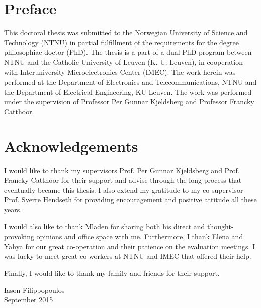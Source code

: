 \vspace*{\fill}
\section*{\Huge Preface }
\bigskip
\bigskip
This doctoral thesis was submitted to the Norwegian University of Science and Technology (NTNU) in partial fulfillment of the requirements for the degree philosophiae doctor (PhD). 
The thesis is a part of a dual PhD program between NTNU and the Catholic University of Leuven (K. U. Leuven), in cooperation with Interuniversity Microelectronics Center (IMEC).
The work herein was performed at the Department of Electronics and Telecommunications, NTNU and the Department of Electrical Engineering, KU Leuven.
The work was performed under the supervision of Professor Per Gunnar Kjeldsberg and Professor Francky Catthoor.

\bigskip
\bigskip

\section*{Acknowledgements}

\bigskip

I would like to thank my supervisors Prof. Per Gunnar Kjeldsberg and Prof. Francky Catthoor for their support and advise through the long process that eventually became this thesis. 
I also extend my gratitude to my co-supervisor Prof. Sverre Hendseth for providing encouragement and positive attitude all these years.

I would also like to thank Mladen for sharing both his direct and thought-provoking opinions and office space with me.
Furthermore, I thank Elena and Yahya for our great co-operation and their patience on the evaluation meetings.
I was lucky to meet great co-workers at NTNU and IMEC that offered their help. 

Finally, I would like to thank my family and friends for their support. 

\bigskip

\begin{flushright}
Iason Filippopoulos \\
September 2015
\end{flushright}

\vspace*{\fill}
